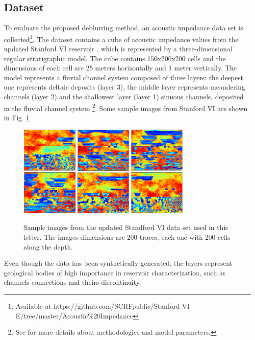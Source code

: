 \documentclass[journal]{IEEEtran}
\begin{document}
\subsection{Dataset}
To evaluate the proposed deblurring method, an acoustic
impedance data set is collected\footnote{Available at https://github.com/SCRFpublic/Stanford-VI-E/tree/master/Acoustic\%20Impedance}. %
The dataset contains a cube of acoustic impedance values
from the updated Stanford VI reservoir \cite{Lee2012}, which
is represented by a three-dimensional regular stratigraphic
model. The cube contains 150x200x200 cells and the dimensions
of each cell are $25$ meters horizontally and $1$ meter vertically.
The model represents a fluvial channel system composed of three
layers: the deepest one represents deltaic deposits (layer 3), the
middle layer represents meandering channels (layer 2) and the shallowest
layer (layer 1) sinuous channels, deposited in the fluvial channel system
\footnote{See \cite{Castro2005} for more details about methodologies and model parameters.}.
Some sample images from Stanford VI are shown in Fig. \ref{fig_examples}
\begin{figure}[!t]
\centering
\includegraphics[width=3.4in]{Figs/_Examples}
\DeclareGraphicsExtensions.
\caption{Sample images from the updated Standford VI data set used in this letter.
The images dimensions are $200$ traces, each one with $200$ cells along the depth.}
\label{fig_examples}
\end{figure}
Even though the data has been synthetically generated,
the layers represent geological bodies of high importance
in reservoir characterization, such as channels connections and theirs
discontinuity. 
\end{document}

